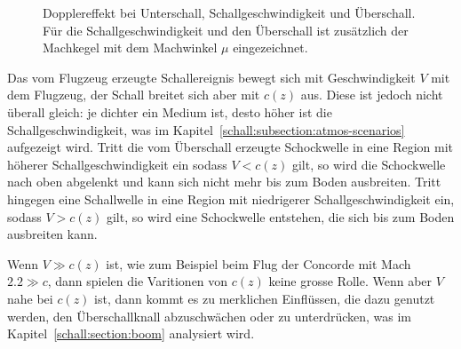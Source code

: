 \begin{figure}
    \centering
{}
    \caption{Dopplereffekt bei Unterschall, Schallgeschwindigkeit und Überschall.
    Für die Schallgeschwindigkeit und den Überschall ist zusätzlich der
    Machkegel mit dem Machwinkel $\mu$ eingezeichnet.}
    \label{fig:schall:mach-zones}
\end{figure}
Das vom Flugzeug erzeugte Schallereignis bewegt sich mit Geschwindigkeit $V$
mit dem Flugzeug, der Schall breitet sich aber mit $c(z)$ aus.
Diese ist jedoch nicht überall gleich: je dichter ein Medium ist, desto
höher ist die Schallgeschwindigkeit, was im
Kapitel~\ref{schall:subsection:atmos-scenarios} aufgezeigt wird.
Tritt die vom Überschall erzeugte Schockwelle in eine Region mit höherer
Schallgeschwindigkeit ein sodass $V<c(z)$ gilt, so wird die Schockwelle
nach oben abgelenkt und kann sich nicht mehr bis zum Boden ausbreiten.
Tritt hingegen eine Schallwelle in eine Region mit niedrigerer
Schallgeschwindigkeit ein, sodass $V>c(z)$ gilt, so wird eine Schockwelle
entstehen, die sich bis zum Boden ausbreiten kann.

Wenn $V \gg c(z)$ ist, wie zum Beispiel beim Flug der Concorde mit Mach
$2.2 \gg c$, dann spielen die Varitionen von $c(z)$ keine grosse Rolle.
Wenn aber $V$ nahe bei $c(z)$ ist, dann kommt es zu merklichen Einflüssen,
die dazu genutzt werden, den Überschallknall abzuschwächen oder zu
unterdrücken, was im Kapitel~\ref{schall:section:boom} analysiert wird.

